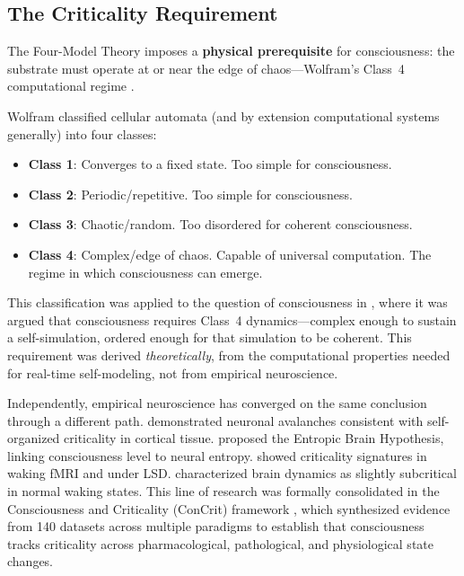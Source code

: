 \documentclass[12pt]{article}
\begin{document}
\subsection{The Criticality Requirement}

The Four-Model Theory imposes a \textbf{physical prerequisite} for consciousness: the substrate must operate at or near the edge of chaos---\hspace{0pt}Wolfram's Class~4 computational regime \citep{Wolfram2002}.

Wolfram classified cellular automata (and by extension computational systems generally) into four classes:
\begin{itemize}
\item \textbf{Class 1}: Converges to a fixed state. Too simple for consciousness.
\item \textbf{Class 2}: Periodic/repetitive. Too simple for consciousness.
\item \textbf{Class 3}: Chaotic/random. Too disordered for coherent consciousness.
\item \textbf{Class 4}: Complex/edge of chaos. Capable of universal computation. The regime in which consciousness can emerge.
\end{itemize}

This classification was applied to the question of consciousness in \citet{Gruber2015}, where it was argued that consciousness requires Class~4 dynamics---\hspace{0pt}complex enough to sustain a self-simulation, ordered enough for that simulation to be coherent. This requirement was derived \emph{theoretically}, from the computational properties needed for real-time self-modeling, not from empirical neuroscience.

Independently, empirical neuroscience has converged on the same conclusion through a different path. \citet{Beggs2003} demonstrated neuronal avalanches consistent with self-organized criticality in cortical tissue. \citet{CarhartHarris2014} proposed the Entropic Brain Hypothesis, linking consciousness level to neural entropy. \citet{Tagliazucchi2012,Tagliazucchi2016} showed criticality signatures in waking fMRI and under LSD. \citet{Priesemann2013} characterized brain dynamics as slightly subcritical in normal waking states. This line of research was formally consolidated in the Consciousness and Criticality (ConCrit) framework \citep{AlgomShriki2026}, which synthesized evidence from 140 datasets across multiple paradigms to establish that consciousness tracks criticality across pharmacological, pathological, and physiological state changes.
\end{document}
